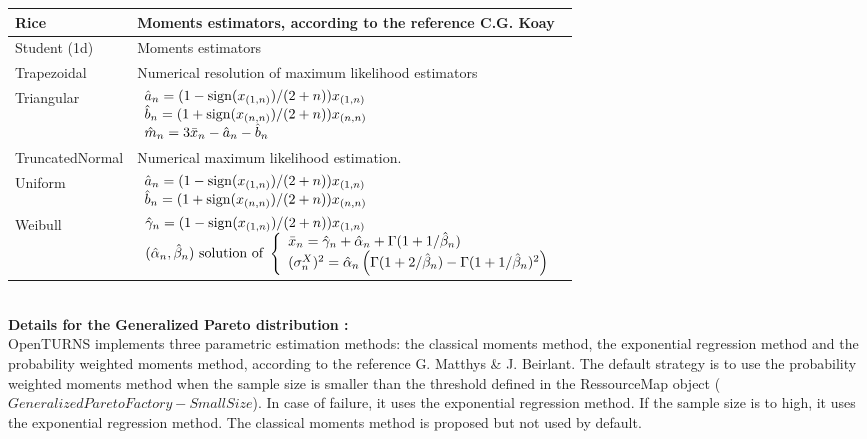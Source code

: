 {  \begin{tabular}{|l|p{12cm}|}
    \hline
    Rice   & Moments estimators, according to the reference C.G. Koay\\
    \hline
    Student (1d) & Moments estimators\\
    \hline
    Trapezoidal   & Numerical resolution of maximum likelihood estimators\\
    \hline
    Triangular & $\begin{array}{l}
      \displaystyle\Hat{a}_n=(1-\mathrm{sign}(x_{(1,n)})/(2+n))x_{(1,n)}\\
      \displaystyle\Hat{b}_n=(1+\mathrm{sign}(x_{(n,n)})/(2+n))x_{(n,n)}\\
      \displaystyle\Hat{m}_n=3\bar{x}_n-\Hat{a}_n-\Hat{b}_n
    \end{array}$\\
    \hline
    TruncatedNormal & Numerical maximum likelihood estimation. \\
    \hline
    Uniform & $\begin{array}{l}
      \displaystyle\Hat{a}_n=(1-\mathrm{sign}(x_{(1,n)})/(2+n))x_{(1,n)}\\
      \displaystyle\Hat{b}_n=(1+\mathrm{sign}(x_{(n,n)})/(2+n))x_{(n,n)}
    \end{array}$\\
    \hline
    Weibull & $\begin{array}{l}
      \displaystyle\Hat{\gamma}_n = (1-\mathrm{sign}(x_{(1,n)})/(2+n))x_{(1,n)}\\
      (\Hat{\alpha}_n,\Hat{\beta}_n)\mbox{ solution of }\left\{\begin{array}{l}
      \bar{x}_n=\Hat{\gamma}_n+\Hat{\alpha}_n+\Gamma(1+1/\Hat{\beta}_n)\\
      (\sigma_n^X)^2=\Hat{\alpha}_n\left(\Gamma(1+2/\Hat{\beta}_n)-\Gamma(1+1/\Hat{\beta}_n)^2\right)
      \end{array}\right.
    \end{array}$\\
    \hline
  \end{tabular}\rule{0pt}{1em}\\



  {\bf Details for the Generalized Pareto distribution :} \\

  OpenTURNS implements three parametric estimation  methods: the classical moments method,
  the exponential regression method and the probability weighted moments method, according to the
  reference G. Matthys \& J. Beirlant. The default strategy is to
  use the probability weighted moments method when the sample size
  is smaller than the threshold defined in    the RessourceMap
  object ($GeneralizedParetoFactory-SmallSize$). In case of failure,
  it uses the  exponential regression method. If the sample
  size is to high, it uses the   exponential regression method. The
  classical moments method is proposed but not used by default.\\




}

